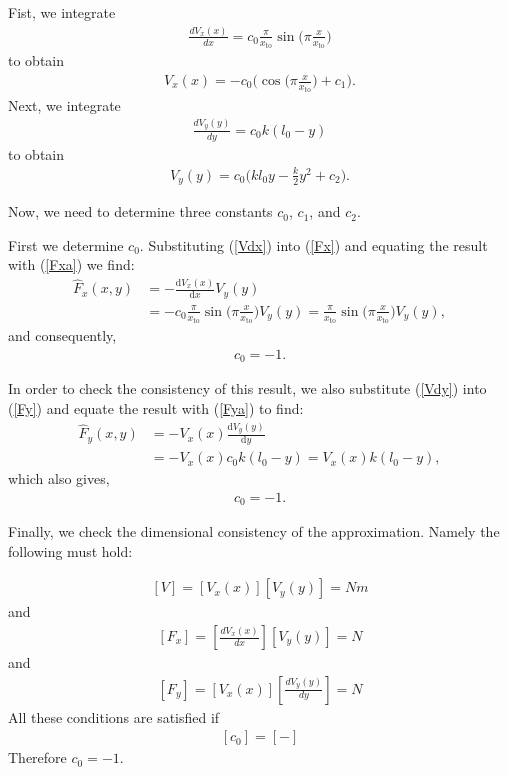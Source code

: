 \documentclass[journal,12pt,onecolumn]{IEEEtran}
\begin{document}
Fist, we integrate
\begin{align}
	\label{Vdx}
\frac{dV_x(x)}{dx} = c_0 \frac{\pi}{x_{\text{to}}} \sin\Big(\pi\frac{x}{x_\text{to}}\Big)
\end{align}
to obtain
\begin{align}
	\label{Vx}
V_x(x) = -c_0 \Big(\cos \Big(\pi\frac{x}{x_\text{to}} \Big)+ c_1 \Big).
\end{align}
Next, we integrate
\begin{align}
	\label{Vdy}
	\frac{dV_y(y)}{dy} = c_0 k(l_0-y) 
\end{align}
to obtain
\begin{align}
	\label{Vy}
V_y(y) = c_0 \Big( kl_0y-\frac{k}{2}y^2+c_2 \Big).
\end{align}

Now, we need to determine three constants $c_0$, $c_1$, and $c_2$.

First we determine $c_0$. Substituting (\ref{Vdx}) into (\ref{Fx}) and equating the result with (\ref{Fxa}) we find:
\begin{align}\nonumber
\hat{F}_x(x,y) &= -\frac{\mathrm{d}V_x(x)}{\mathrm{d} x} V_y(y)\\
&= - c_0 \frac{\pi}{x_{\text{to}}}\sin\Big(\pi\frac{x}{x_\text{to}}\Big) V_y(y) = \frac{\pi}{x_{\text{to}}} \sin\Big(\pi\frac{x}{x_\text{to}}\Big) V_y(y),
\end{align}
and consequently,
\begin{align}
c_0 =-1.
\end{align}

In order to check the consistency of this result, we also substitute (\ref{Vdy}) into (\ref{Fy}) and equate the result with (\ref{Fya}) to find:
\begin{align}\nonumber
	\hat{F}_y(x,y) &= - V_x(x) \frac{\mathrm{d}V_y(y)}{\mathrm{d} y}\\
	&= - V_x(x) c_0 k(l_0-y) = V_x(x) k(l_0-y),
\end{align}
which also gives,
\begin{align}
	\label{c0}
	c_0 =-1.
\end{align}

Finally, we check the dimensional consistency of the approximation. Namely the following must hold:

\begin{align} \nonumber
[V] = [V_x(x)][V_y(y)]=Nm
\end{align}
and
\begin{align} \nonumber
	[F_x] = [\frac{dV_x(x)}{dx}][V_y(y)]=N
\end{align}
and
\begin{align} \nonumber
	[F_y] = [V_x(x)][\frac{dV_y(y)}{dy}]=N
\end{align}
All these conditions are satisfied if
\begin{align} \nonumber
	[c_0] = [-]
\end{align}
Therefore $c_0=-1$.
\end{document}
